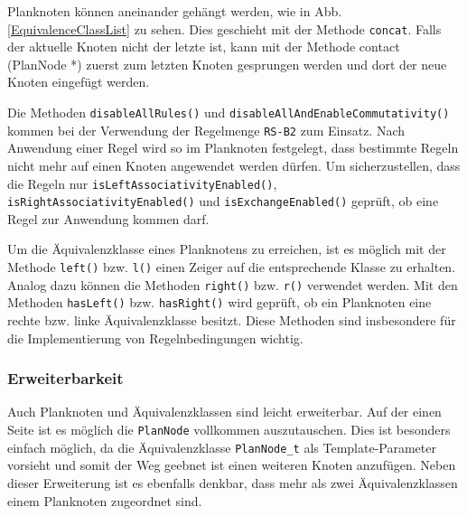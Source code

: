 Planknoten können aneinander gehängt werden, wie in Abb. \ref{EquivalenceClassList} zu sehen. Dies geschieht mit der Methode \texttt{concat}. Falls der aktuelle Knoten nicht der letzte ist, kann mit der Methode contact (PlanNode *) zuerst zum letzten Knoten gesprungen werden und dort der neue Knoten eingefügt werden. 

Die Methoden \texttt{disable\-All\-Rules()} und \texttt{disable\-All\-And\-Enable\-Commutativity()} kommen bei der Verwendung der Regelmenge \texttt{RS-B2} zum Einsatz. Nach Anwendung einer Regel wird so im Planknoten festgelegt, dass bestimmte Regeln nicht mehr auf einen Knoten angewendet werden dürfen. Um sicherzustellen, dass die Regeln nur \texttt{is\-Left\-Associativity\-Enabled()}, \texttt{is\-Right\-Associativity\-Enabled()} und \texttt{is\-Exchange\-Enabled()} geprüft, ob eine Regel zur Anwendung kommen darf.

Um die Äquivalenzklasse eines Planknotens zu erreichen, ist es möglich mit der Methode \texttt{left()} bzw. \texttt{l()} einen Zeiger auf die entsprechende Klasse zu erhalten. Analog dazu können die Methoden \texttt{right()} bzw. \texttt{r()} verwendet werden. Mit den Methoden \texttt{has\-Left()} bzw. \texttt{has\-Right()} wird geprüft, ob ein Planknoten eine rechte bzw. linke Äquivalenzklasse besitzt. Diese Methoden sind insbesondere für die Implementierung von Regelnbedingungen wichtig.


\subsubsection{Erweiterbarkeit}

Auch Planknoten und Äquivalenzklassen sind leicht erweiterbar. Auf der einen Seite ist es möglich die \texttt{Plan\-Node} vollkommen auszutauschen. Dies ist besonders einfach möglich, da die Äquivalenzklasse \texttt{PlanNode\_t} als Template-Parameter vorsieht und somit der Weg geebnet ist einen weiteren Knoten anzufügen. Neben dieser Erweiterung ist es ebenfalls denkbar, dass mehr als zwei Äquivalenzklassen einem Planknoten zugeordnet sind. 